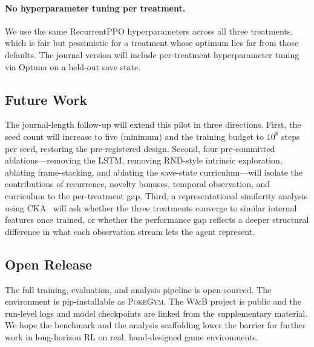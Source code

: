 \paragraph{No hyperparameter tuning per treatment.}
We use the same RecurrentPPO hyperparameters across all three
treatments, which is fair but pessimistic for a treatment whose
optimum lies far from those defaults.  The journal version will
include per-treatment hyperparameter tuning via Optuna on a held-out
save state.

\subsection{Future Work}
\label{sec:future-work}

The journal-length follow-up will extend this pilot in three
directions.  First, the seed count will increase to five (minimum)
and the training budget to $10^8$ steps per seed, restoring the
pre-registered design.  Second, four pre-committed
ablations---removing the LSTM, removing RND-style intrinsic
exploration, ablating frame-stacking, and ablating the save-state
curriculum---will isolate the contributions of recurrence, novelty
bonuses, temporal observation, and curriculum to the per-treatment
gap.  Third, a representational similarity analysis using
CKA~\citep{kornblith2019cka} will ask whether the three treatments
converge to similar internal features once trained, or whether the
performance gap reflects a deeper structural difference in what each
observation stream lets the agent represent.

\subsection{Open Release}

The full training, evaluation, and analysis pipeline is open-sourced.
The environment is pip-installable as \textsc{PokeGym}.  The W\&B
project is public and the run-level logs and model checkpoints are
linked from the supplementary material.  We hope the benchmark and
the analysis scaffolding lower the barrier for further work in
long-horizon RL on real, hand-designed game environments.
